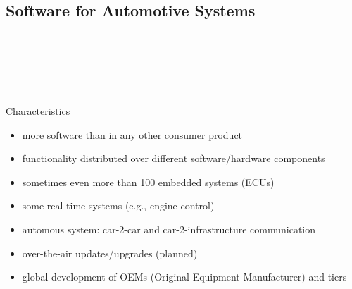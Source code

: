 \subsection{Software for Automotive Systems}
\begin{frame}{\insertsubsection\ \mytitlesource{\ebertfavaro}}
	\centering{}
\end{frame}
\begin{frame}{\insertsubsection\ \mytitlesource{\ebertfavaro}}
	\centering{}
\end{frame}

\begin{frame}{\insertsubsection\ \mytitlesource{\staron}}
	\begin{fancycolumns}[animation=none]
		\begin{definition}{Characteristics}
			\begin{itemize}
				\item more software than in any other consumer product
				\item functionality distributed over different software/hardware components
				\item sometimes even more than 100 embedded systems (ECUs)
				\item some real-time systems (e.g., engine control)
				\item automous system: car-2-car and car-2-infrastructure communication
				\item over-the-air updates/upgrades (planned)
				\item global development of OEMs (Original Equipment Manufacturer) and tiers 
			\end{itemize}
		\end{definition}
		\nextcolumn
	\end{fancycolumns}
\end{frame}

